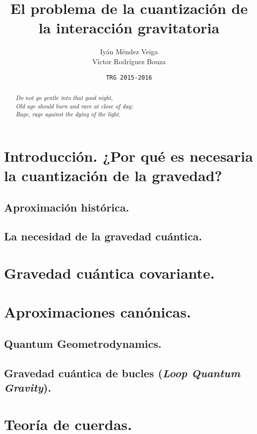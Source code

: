 \documentclass[a4paper,titlepage]{article}
\title{\Huge\textbf{El problema de la cuantización de la interacción gravitatoria}}
\author{\textsf{Iyán Méndez Veiga}\\ \textsf{Víctor Rodríguez Bouza}}
\date{\texttt{TRG 2015-2016}}
\begin{document}
\maketitle

\begin{abstract}\centering\textit{
Do not go gentle into that good night,\\
Old age should burn and rave at close of day;\\
Rage, rage against the dying of the light.}
\end{abstract}
%
\section{Introducción. ¿Por qué es necesaria la cuantización de la gravedad?} %
\subsection{Aproximación histórica.}

\subsection{La necesidad de la gravedad cuántica.}

%
\section{Gravedad cuántica covariante.} %

%
\section{Aproximaciones canónicas.} %
\subsection{Quantum Geometrodynamics.}

\subsection{Gravedad cuántica de bucles (\textit{Loop Quantum Gravity}).}

%
\section{Teoría de cuerdas.}
\end{document}
